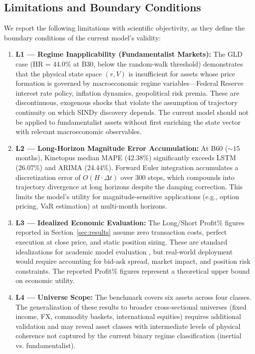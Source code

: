 \documentclass[11pt,a4paper]{article}
\begin{document}
\subsection{Limitations and Boundary Conditions}

We report the following limitations with scientific objectivity, as they define the boundary conditions of the current model's validity:
\begin{enumerate}[leftmargin=1.5em]
    \item \textbf{L1 --- Regime Inapplicability (Fundamentalist Markets):} The GLD case (HR = 44.0\% at B30, below the random-walk threshold) demonstrates that the physical state space $(r, V)$ is insufficient for assets whose price formation is governed by macroeconomic regime variables---Federal Reserve interest rate policy, inflation dynamics, geopolitical risk premia. These are discontinuous, exogenous shocks that violate the assumption of trajectory continuity on which SINDy discovery depends. The current model should not be applied to fundamentalist assets without first enriching the state vector with relevant macroeconomic observables.
    \item \textbf{L2 --- Long-Horizon Magnitude Error Accumulation:} At B60 ($\sim 15$ months), Kinetopus median MAPE (42.38\%) significantly exceeds LSTM (26.07\%) and ARIMA (24.44\%). Forward Euler integration accumulates a discretization error of $O(H \cdot \Delta t)$ over 300 steps, which compounds into trajectory divergence at long horizons despite the damping correction. This limits the model's utility for magnitude-sensitive applications (e.g., option pricing, VaR estimation) at multi-month horizons.
    \item \textbf{L3 --- Idealized Economic Evaluation:} The Long/Short Profit\% figures reported in Section~\ref{sec:results} assume zero transaction costs, perfect execution at close price, and static position sizing. These are standard idealizations for academic model evaluation \cite{fischer2018deep}, but real-world deployment would require accounting for bid-ask spread, market impact, and position risk constraints. The reported Profit\% figures represent a theoretical upper bound on economic utility.
    \item \textbf{L4 --- Universe Scope:} The benchmark covers six assets across four classes. The generalization of these results to broader cross-sectional universes (fixed income, FX, commodity baskets, international equities) requires additional validation and may reveal asset classes with intermediate levels of physical coherence not captured by the current binary regime classification (inertial vs. fundamentalist).
\end{enumerate}
\end{document}
